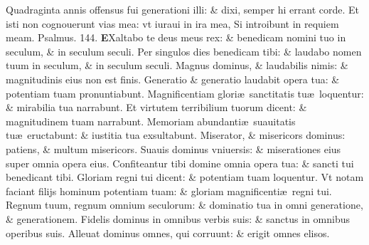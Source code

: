 \documentclass[a5paper,10pt]{book}
\def\ae{æ}
\begin{document}
\begin{multicols*}{2}
\newline \color{red} Q\color{black}uadraginta annis offensus fui generationi illi: \& dixi, semper hi errant corde.
\newline \color{red} E\color{black}t isti non cognouerunt vias mea: vt iuraui in ira mea, Si introibunt in requiem meam.%
\quad \color{red} Psalmus. 144.\color{black}
\lettrine[lines=2]{\bfseries \color{red} E}{}Xaltabo te deus meus rex: \& benedicam nomini tuo in seculum, \& in seculum seculi.
\newline \color{red} P\color{black}er singulos dies benedicam tibi: \& laudabo nomen tuum in seculum, \& in seculum seculi.
\newline \color{red} M\color{black}agnus dominus, \& laudabilis nimis: \& magnitudinis eius non est finis.
\newline \color{red} G\color{black}eneratio \& generatio laudabit opera tua: \& potentiam tuam pronuntiabunt.
\newline \color{red} M\color{black}agnificentiam glori\ae \ sanctitatis tu\ae \ loquentur: \& mirabilia tua narrabunt.
\newline \color{red} E\color{black}t virtutem terribilium tuorum dicent: \& magnitudinem tuam narrabunt.
\newline \color{red} M\color{black}emoriam abundanti\ae \ suauitatis tu\ae \ eructabunt: \& iustitia tua exsultabunt.
\newline \color{red} M\color{black}iserator, \& misericors dominus: patiens, \& multum misericors.
\newline \color{red} S\color{black}uauis dominus vniuersis: \& miserationes eius super omnia opera eius.
\newline \color{red} C\color{black}onfiteantur tibi domine omnia opera tua: \& sancti tui benedicant tibi.
\newline \color{red} G\color{black}loriam regni tui dicent: \& potentiam tuam loquentur.
\newline \color{red} V\color{black}t notam faciant filijs hominum potentiam tuam: \& gloriam magnificenti\ae \ regni tui.
\newline \color{red} R\color{black}egnum tuum, regnum omnium seculorum: \& dominatio tua in omni generatione, \& generationem.
\newline \color{red} F\color{black}idelis dominus in omnibus verbis suis: \& sanctus in omnibus operibus suis.
\newline \color{red} A\color{black}lleuat dominus omnes, qui corruunt: \& erigit omnes elisos.

\end{multicols*}
\end{document}
